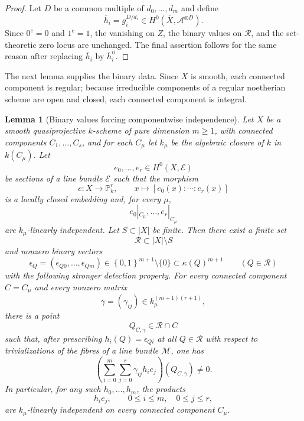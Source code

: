 \documentclass{lms}
\newtheorem{lemma}[theorem]{Lemma}
\newcommand{\PP}{\mathbb P}
\newcommand{\Ample}{\mathcal A}
\newcommand{\MM}{\mathcal M}
\newcommand{\EE}{\mathcal E}
\newcommand{\kk}{\kappa}
\newcommand{\barX}{\overline{X}}
\newcommand{\set}[1]{\left\{#1\right\}}
\begin{document}
\begin{proof}
Let $D$ be a common multiple of $d_0,\ldots,d_m$ and define
\[
        \overline h_i=g_i^{D/d_i}\in H^0(\barX,\Ample^{\otimes D}).
\]
Since $0^e=0$ and $1^e=1$, the vanishing on $Z$, the binary values on $\mathcal R$, and the set-theoretic zero locus are unchanged.  The final assertion follows for the same reason after replacing $\overline h_i$ by $\overline h_i^n$.
\end{proof}


The next lemma supplies the binary data.  Since $X$ is smooth, each connected component is regular; because irreducible components of a regular noetherian scheme are open and closed, each connected component is integral.

\begin{lemma}[Binary values forcing componentwise independence]\label{lem:binary}
Let $X$ be a smooth quasiprojective $k$-scheme of pure dimension $m\ge1$, with connected components $C_1,\ldots,C_s$, and for each $C_\mu$ let $k_\mu$ be the algebraic closure of $k$ in $k(C_\mu)$.  Let
\[
        e_0,\ldots,e_r\in H^0(X,\EE)
\]
be sections of a line bundle $\EE$ such that the morphism
\[
        e:X\longrightarrow\PP^r_k,
        \qquad
        x\longmapsto[e_0(x):\cdots:e_r(x)]
\]
is a locally closed embedding and, for every $\mu$,
\[
        e_0|_{C_\mu},\ldots,e_r|_{C_\mu}
\]
are $k_\mu$-linearly independent.  Let $S\subset |X|$ be finite.  Then there exist a finite set
\[
        \mathcal R\subset |X|\setminus S
\]
and nonzero binary vectors
\[
        \epsilon_Q=(\epsilon_{Q0},\ldots,\epsilon_{Qm})
        \in\set{0,1}^{m+1}\setminus\{0\}
        \subset \kk(Q)^{m+1}
        \qquad(Q\in\mathcal R)
\]
with the following stronger detection property.  For every connected component $C=C_\mu$ and every nonzero matrix
\[
        \gamma=(\gamma_{ij})\in k_\mu^{(m+1)(r+1)},
\]
there is a point
\[
        Q_{C,\gamma}\in\mathcal R\cap C
\]
such that, after prescribing $h_i(Q)=\epsilon_{Qi}$ at all $Q\in\mathcal R$ with respect to trivializations of the fibres of a line bundle $\MM$, one has
\[
        \left(\sum_{i=0}^{m}\sum_{j=0}^{r}\gamma_{ij}h_i e_j\right)(Q_{C,\gamma})\ne0.
\]
In particular, for any such $h_0,\ldots,h_m$, the products
\[
        h_i e_j,
        \qquad
        0\le i\le m,
        \quad
        0\le j\le r,
\]
are $k_\mu$-linearly independent on every connected component $C_\mu$.
\end{lemma}
\end{document}
